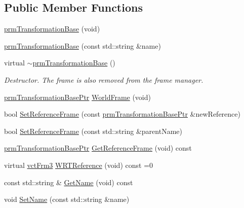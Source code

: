 \subsection*{Public Member Functions}
\begin{DoxyCompactItemize}
\item 
\hyperlink{classprm_transformation_base_adc371d45bc7624d48f3a1c7e67dbdc8d}{prm\-Transformation\-Base} (void)
\item 
\hyperlink{classprm_transformation_base_a32ac37ecee9981c1cd3473fe0468d5e9}{prm\-Transformation\-Base} (const std\-::string \&name)
\item 
virtual \hyperlink{classprm_transformation_base_a929a69f4bae241f7ac4642afd3ab790f}{$\sim$prm\-Transformation\-Base} ()
\begin{DoxyCompactList}\small\item\em Destructor. The frame is also removed from the frame manager. \end{DoxyCompactList}\item 
\hyperlink{prm_transformation_base_8h_a881a6a7d2191474974cdf36d79e1df08}{prm\-Transformation\-Base\-Ptr} \hyperlink{classprm_transformation_base_a5ba18c10d80d47eab444fd1855eccabb}{World\-Frame} (void)
\item 
bool \hyperlink{classprm_transformation_base_a00dcce2732a0fd6679899720175811bf}{Set\-Reference\-Frame} (const \hyperlink{prm_transformation_base_8h_a881a6a7d2191474974cdf36d79e1df08}{prm\-Transformation\-Base\-Ptr} \&new\-Reference)
\item 
bool \hyperlink{classprm_transformation_base_aee556fcc432c0c71afcd11760fa9e1eb}{Set\-Reference\-Frame} (const std\-::string \&parent\-Name)
\item 
\hyperlink{prm_transformation_base_8h_a881a6a7d2191474974cdf36d79e1df08}{prm\-Transformation\-Base\-Ptr} \hyperlink{classprm_transformation_base_a788578194fc2a7bc85ac207a39a77bb7}{Get\-Reference\-Frame} (void) const 
\item 
virtual \hyperlink{vct_transformation_types_8h_a81feda0a02c2d1bc26e5553f409fed20}{vct\-Frm3} \hyperlink{classprm_transformation_base_a64df0853559412fe0c48fc610ad2f6bf}{W\-R\-T\-Reference} (void) const =0
\end{DoxyCompactItemize}
{\bf }\par
\begin{DoxyCompactItemize}
\item 
const std\-::string \& \hyperlink{classprm_transformation_base_aa1d31303da1f577db05fd44dbf5a0e45}{Get\-Name} (void) const 
\item 
void \hyperlink{classprm_transformation_base_a63399acd571f557cca020710f45df4e0}{Set\-Name} (const std\-::string \&name)
\end{DoxyCompactItemize}

